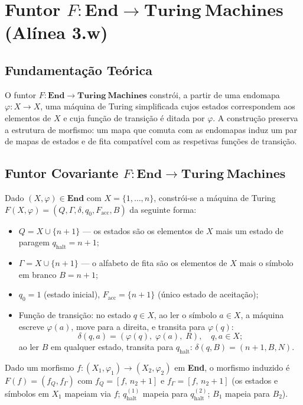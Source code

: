 \section{Funtor $F: \mathbf{End} \to \mathbf{Turing\ Machines}$ (Alínea 3.w)}
\label{sec:functor-end-turing}

\subsection{Fundamentação Teórica}

O funtor $F: \mathbf{End} \to \mathbf{Turing\ Machines}$ constrói, a partir de uma endomapa $\varphi: X \to X$, uma máquina de Turing simplificada cujos estados correspondem aos elementos de $X$ e cuja função de transição é ditada por $\varphi$. A construção preserva a estrutura de morfismo: um mapa que comuta com as endomapas induz um par de mapas de estados e de fita compatível com as respetivas funções de transição.

\subsection{Funtor Covariante $F: \mathbf{End} \to \mathbf{Turing\ Machines}$}

\begin{definition}
Dado $(X, \varphi) \in \mathbf{End}$ com $X = \{1,\ldots,n\}$, constrói-se a máquina de Turing $F(X,\varphi) = (Q, \Gamma, \delta, q_0, F_{\mathrm{acc}}, B)$ da seguinte forma:
\begin{itemize}
    \item $Q = X \cup \{n{+}1\}$ --- os estados são os elementos de $X$ mais um estado de paragem $q_{\mathrm{halt}} = n{+}1$;
    \item $\Gamma = X \cup \{n{+}1\}$ --- o alfabeto de fita são os elementos de $X$ mais o símbolo em branco $B = n{+}1$;
    \item $q_0 = 1$ (estado inicial), $F_{\mathrm{acc}} = \{n{+}1\}$ (único estado de aceitação);
    \item Função de transição: no estado $q \in X$, ao ler o símbolo $a \in X$, a máquina escreve $\varphi(a)$, move para a direita, e transita para $\varphi(q)$:
    \[
        \delta(q, a) = (\varphi(q),\; \varphi(a),\; R), \quad q, a \in X;
    \]
    ao ler $B$ em qualquer estado, transita para $q_{\mathrm{halt}}$: $\delta(q, B) = (n{+}1, B, N)$.
\end{itemize}
Dado um morfismo $f: (X_1, \varphi_1) \to (X_2, \varphi_2)$ em \textbf{End}, o morfismo induzido é $F(f) = (f_Q, f_\Gamma)$ com $f_Q = [f,\, n_2{+}1]$ e $f_\Gamma = [f,\, n_2{+}1]$ (os estados e símbolos em $X_1$ mapeiam via $f$; $q_{\mathrm{halt}}^{(1)}$ mapeia para $q_{\mathrm{halt}}^{(2)}$; $B_1$ mapeia para $B_2$).
\end{definition}

